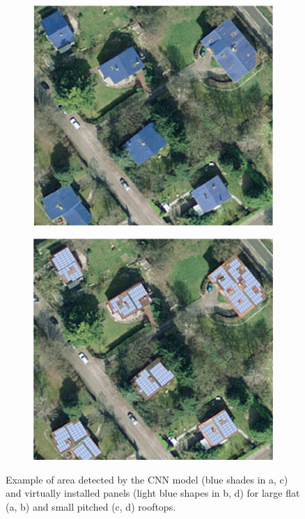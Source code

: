 \begin{figure}[tb]
\begin{subfigure}{.4\textwidth}
  \centering
  \includegraphics[width=.9\linewidth]{images/Figs/images3.png}
  \subcaption{}
  \label{figc:CNN_images}
\end{subfigure}
\begin{subfigure}{.4\textwidth}
  \centering
  \includegraphics[width=.9\linewidth]{images/Figs/images4.png}  
  \subcaption{}
    \label{figd:CNN_images}
\end{subfigure}
\caption{Example of area detected by the CNN model (blue shades in a, c) and virtually installed panels (light blue shapes in b, d) for large flat (a, b) and small pitched (c, d) rooftops.}
\label{fig:CNN_images}
\end{figure}

